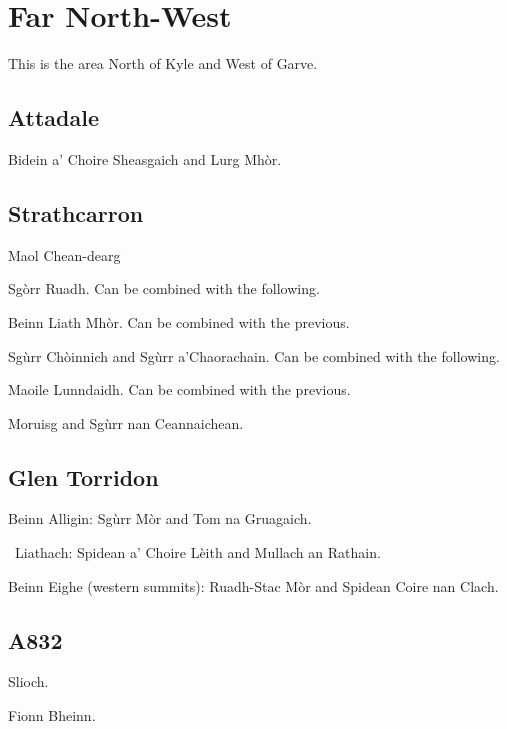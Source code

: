 \section{Far North-West}

This is the area North of Kyle and West of Garve.

\subsection{Attadale}

\begin{munros}
\item
Bidein a' Choire Sheasgaich and Lurg Mhòr.
\end{munros}


\subsection{Strathcarron}


\begin{munros}
\item
Maol Chean-dearg

\item
Sgòrr Ruadh.  Can be combined with the following.

\item
Beinn Liath Mhòr.  Can be combined with the previous. 

\item
Sgùrr Chòinnich and Sgùrr a'Chaorachain.  Can be combined with the following.

\item
Maoile Lunndaidh.  Can be combined with the previous. 

\item
Moruisg and Sgùrr nan Ceannaichean.
\end{munros}


\subsection{Glen Torridon}

\begin{munros}
\item
Beinn Alligin: Sgùrr Mòr and Tom na Gruagaich.

\item \target\
Liathach: Spidean a' Choire Lèith and Mullach an Rathain.

\item
Beinn Eighe (western summits): Ruadh-Stac Mòr and Spidean Coire nan Clach.
\end{munros}


\subsection{A832}

\begin{munros}
\item
Slioch.

\item
Fionn Bheinn.
\end{munros}

